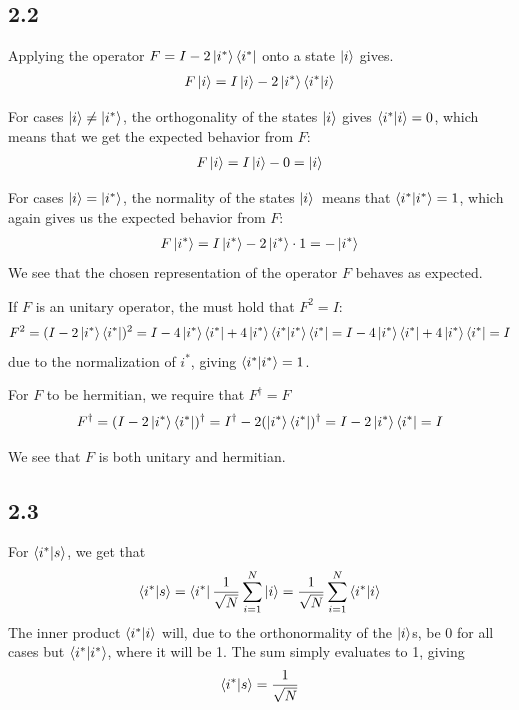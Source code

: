 \documentclass[12p,a4paper]{article}
\newcommand{\0}{\ket{0}}
\newcommand{\1}{\ket{1}}
\begin{document}
\subsection*{2.2}
Applying the operator $F = I - 2 \ket{i^*}\bra{i^*}$ onto a state $\ket{i}$ gives.
\begin{align*}
    F\ket{i} = I\ket{i} - 2 \ket{i^*}\bra{i^*}\ket{i}
\end{align*}

For cases $\ket{i} \neq \ket{i^*}$, the orthogonality of the states $\ket{i}$ gives $\bra{i^*}\ket{i} = 0$, which means that we get the expected behavior from $F$:
\begin{align*}
    F\ket{i} = I\ket{i} - 0 = \ket{i}
\end{align*}

For cases $\ket{i} = \ket{i^*}$, the normality of the states $\ket{i}$ means that $\bra{i^*}\ket{i^*} = 1$, which again gives us the expected behavior from $F$:
\begin{align*}
    F\ket{i^*} = I\ket{i^*} - 2\ket{i^*}\cdot 1 = -\ket{i^*}
\end{align*}
We see that the chosen representation of the operator $F$ behaves as expected.

If $F$ is an unitary operator, the must hold that $F^2 = I$:
\begin{align*}
    F^2 = (I - 2\ket{i^*}\bra{i^*})^2 = I - 4\ket{i^*}\bra{i^*} + 4\ket{i^*}\bra{i^*}\ket{i^*}\bra{i^*} = I - 4\ket{i^*}\bra{i^*} + 4\ket{i^*}\bra{i^*} = I
\end{align*}
due to the normalization of $i^*$, giving $\bra{i^*}\ket{i^*} = 1$.

For $F$ to be hermitian, we require that $F^\dag = F$
\begin{align*}
    F^\dag = (I - 2\ket{i^*}\bra{i^*})^\dag = I^\dag - 2(\ket{i^*}\bra{i^*})^\dag = I - 2\ket{i^*}\bra{i^*} = I
\end{align*}

We see that $F$ is both unitary and hermitian.

\subsection*{2.3}
For $\bra{i^*}\ket{s}$, we get that
\begin{align*}
    \bra{i^*}\ket{s} = \bra{i^*}\frac{1}{\sqrt{N}}\sum\limits_{i=1}^N \ket{i} = \frac{1}{\sqrt{N}}\sum\limits_{i=1}^N \bra{i^*}\ket{i}
\end{align*}
The inner product $\bra{i^*}\ket{i}$ will, due to the orthonormality of the $\ket{i}$s, be 0 for all cases but $\bra{i^*}\ket{i^*}$, where it will be 1. The sum simply evaluates to 1, giving
\begin{align}\label{eqn:i*s}
    \bra{i^*}\ket{s} = \frac{1}{\sqrt{N}}
\end{align}
\end{document}

